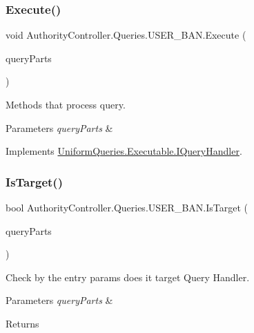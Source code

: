 \subsubsection{\texorpdfstring{Execute()}{Execute()}}
{\footnotesize\ttfamily void Authority\+Controller.\+Queries.\+U\+S\+E\+R\+\_\+\+B\+A\+N.\+Execute (\begin{DoxyParamCaption}\item[{\mbox{\hyperlink{struct_uniform_queries_1_1_query_part}{Query\+Part}} \mbox{[}$\,$\mbox{]}}]{query\+Parts }\end{DoxyParamCaption})}



Methods that process query. 


\begin{DoxyParams}{Parameters}
{\em query\+Parts} & \\
\hline
\end{DoxyParams}


Implements \mbox{\hyperlink{interface_uniform_queries_1_1_executable_1_1_i_query_handler_a3268d72c0388f5e3debba4d73bdfe523}{Uniform\+Queries.\+Executable.\+I\+Query\+Handler}}.

\mbox{\label{class_authority_controller_1_1_queries_1_1_u_s_e_r___b_a_n_a29c898b411adc3a0edbed31cf90e007b}} 
\subsubsection{\texorpdfstring{Is\+Target()}{IsTarget()}}
{\footnotesize\ttfamily bool Authority\+Controller.\+Queries.\+U\+S\+E\+R\+\_\+\+B\+A\+N.\+Is\+Target (\begin{DoxyParamCaption}\item[{\mbox{\hyperlink{struct_uniform_queries_1_1_query_part}{Query\+Part}} \mbox{[}$\,$\mbox{]}}]{query\+Parts }\end{DoxyParamCaption})}



Check by the entry params does it target Query Handler. 


\begin{DoxyParams}{Parameters}
{\em query\+Parts} & \\
\hline
\end{DoxyParams}
\begin{DoxyReturn}{Returns}

\end{DoxyReturn}


